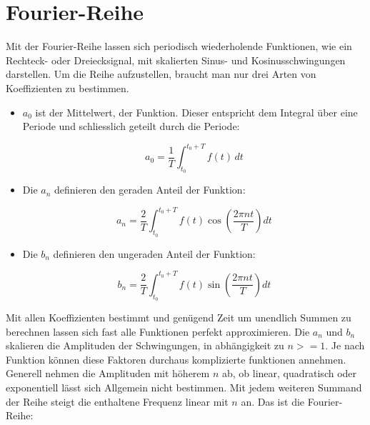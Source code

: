 %
%
%
%

\section{Fourier-Reihe\label{fourier:section:GrundlagenFourierAnalyse}}


Mit der Fourier-Reihe lassen sich periodisch wiederholende Funktionen, wie ein Rechteck- oder Dreiecksignal, mit skalierten Sinus- und Kosinusschwingungen darstellen. 
Um die Reihe aufzustellen, braucht man nur drei Arten von Koeffizienten zu bestimmen. 

\begin{itemize}
	\item $a_0$ ist der Mittelwert, der Funktion. 
	Dieser entspricht dem Integral über eine Periode und schliesslich geteilt durch die Periode: 
	
	\begin{equation}
		a_0 = \frac{1}{T} \int_{t_0}^{t_0 + T} f(t) \, dt
	\end{equation}
	
	\item Die $a_n$ definieren den geraden Anteil der Funktion:
	
	\begin{equation}
		a_n = \frac{2}{T} \int_{t_0}^{t_0 + T} f(t) \cos\left(\frac{2\pi n t}{T}\right) dt
	\end{equation}
	
	\item Die $b_n$ definieren den ungeraden Anteil der Funktion:
	
	\begin{equation}
		b_n = \frac{2}{T} \int_{t_0}^{t_0 + T} f(t) \sin\left(\frac{2\pi n t}{T}\right) dt
	\end{equation}
	
\end{itemize}


Mit allen Koeffizienten bestimmt und genügend Zeit um unendlich Summen zu berechnen lassen sich fast alle Funktionen perfekt approximieren.
Die $a_n$ und $b_n$ skalieren die Amplituden der Schwingungen, in abhängigkeit zu $n>=1$. 
Je nach Funktion können diese Faktoren durchaus komplizierte funktionen annehmen.
Generell nehmen die Amplituden mit höherem $n$ ab, ob linear, quadratisch oder exponentiell lässt sich Allgemein nicht bestimmen.
Mit jedem weiteren Summand der Reihe steigt die enthaltene Frequenz linear mit $n$ an.
Das ist die Fourier-Reihe:


